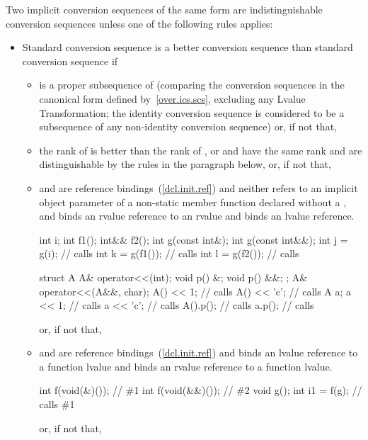 \pnum
Two implicit conversion sequences of the same form are
indistinguishable conversion sequences unless one of the
following rules applies:

\begin{itemize}
\item
Standard conversion sequence
is a better conversion
sequence than standard conversion sequence
if

\begin{itemize}
\item
{}%
is a proper subsequence of
(comparing the conversion sequences in the canonical form defined
by~\ref{over.ics.scs}, excluding any Lvalue Transformation;
the identity conversion sequence is considered to be a
subsequence of any non-identity conversion sequence)
or, if not that,
\item
the rank of
is better than the rank of
,
or
and
have the same rank and are distinguishable by the rules
in the paragraph below,
or, if not that,

\item {} and  are reference bindings~(\ref{dcl.init.ref}) and
neither refers to an implicit object parameter of a non-static member function
declared without a ,
and  binds an rvalue reference to an
rvalue and  binds an lvalue reference.

\enterexample
\begin{codeblock}
int i;
int f1();
int&& f2();
int g(const int&);
int g(const int&&);
int j = g(i);                   // calls 
int k = g(f1());                // calls 
int l = g(f2());                // calls 

struct A {
  A& operator<<(int);
  void p() &;
  void p() &&;
};
A& operator<<(A&&, char);
A() << 1;                       // calls 
A() << 'c';                     // calls 
A a;
a << 1;                         // calls 
a << 'c';                       // calls 
A().p();                        // calls 
a.p();                          // calls 
\end{codeblock}
\exitexample
or, if not that,

\item
{} and  are reference bindings~(\ref{dcl.init.ref}) and
 binds an lvalue reference to a function lvalue and  binds
an rvalue reference to a function lvalue. \enterexample
\begin{codeblock}
int f(void(&)());               // \#1
int f(void(&&)());              // \#2
void g();
int i1 = f(g);                  // calls \#1
\end{codeblock}
\exitexample
or, if not that,


\end{itemize}
\end{itemize}
